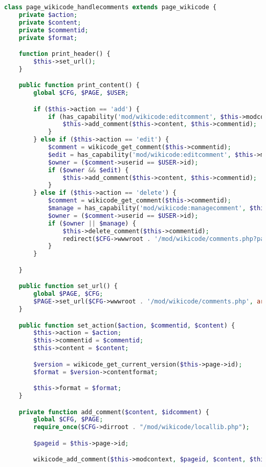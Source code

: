 \begin{lstlisting}[language=PHP]
class page_wikicode_handlecomments extends page_wikicode {
    private $action;
    private $content;
    private $commentid;
    private $format;

    function print_header() {
        $this->set_url();
    }

    public function print_content() {
        global $CFG, $PAGE, $USER;

        if ($this->action == 'add') {
            if (has_capability('mod/wikicode:editcomment', $this->modcontext)) {
                $this->add_comment($this->content, $this->commentid);
            }
        } else if ($this->action == 'edit') {
            $comment = wikicode_get_comment($this->commentid);
            $edit = has_capability('mod/wikicode:editcomment', $this->modcontext);
            $owner = ($comment->userid == $USER->id);
            if ($owner && $edit) {
                $this->add_comment($this->content, $this->commentid);
            }
        } else if ($this->action == 'delete') {
            $comment = wikicode_get_comment($this->commentid);
            $manage = has_capability('mod/wikicode:managecomment', $this->modcontext);
            $owner = ($comment->userid == $USER->id);
            if ($owner || $manage) {
                $this->delete_comment($this->commentid);
                redirect($CFG->wwwroot . '/mod/wikicode/comments.php?pageid=' . $this->page->id, get_string('deletecomment', 'wikicode'), 2);
            }
        }

    }

    public function set_url() {
        global $PAGE, $CFG;
        $PAGE->set_url($CFG->wwwroot . '/mod/wikicode/comments.php', array('pageid' => $this->page->id));
    }

    public function set_action($action, $commentid, $content) {
        $this->action = $action;
        $this->commentid = $commentid;
        $this->content = $content;

        $version = wikicode_get_current_version($this->page->id);
        $format = $version->contentformat;

        $this->format = $format;
    }

    private function add_comment($content, $idcomment) {
        global $CFG, $PAGE;
        require_once($CFG->dirroot . "/mod/wikicode/locallib.php");

        $pageid = $this->page->id;

        wikicode_add_comment($this->modcontext, $pageid, $content, $this->format);


\end{lstlisting}
